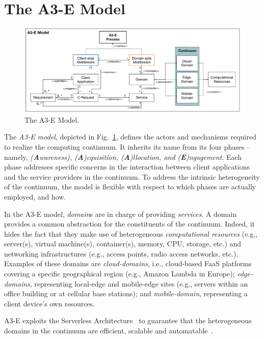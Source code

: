 \section{The A3-E Model}\label{sec:proposal}

\begin{figure}[tbp]
	\includegraphics[width=1\textwidth]{figs/A3-E-model.pdf}
	\caption{The A3-E Model.}
	\label{fig:A3-E-model}
\end{figure}

The \textit{A3-E model}, depicted in Fig.~\ref{fig:A3-E-model}, defines the actors and mechanisms required to realize the computing continuum. It inherits its name from its four phases -- namely, \textit{(\textbf{A}wareness), (\textbf{A})cquisition, (\textbf{A})llocation, and (\textbf{E})ngagement}. Each phase addresses specific concerns in the interaction between client applications and the service providers in the continuum. To address the intrinsic heterogeneity of the continuum, the model is flexible with respect to which phases are actually employed, and how.

In the A3-E model, \textit{domain}s are in charge of providing \textit{services}. A domain provides a common abstraction for the constituents of the continuum. Indeed, it hides the fact that they make use of heterogeneous \textit{computational resources} (e.g., server(s), virtual machine(s), container(s), memory, CPU, storage, etc.) and networking infrastructures (e.g., access points, radio access networks, etc.). Examples of these domains are \textit{cloud-domains}, i.e., cloud-based FaaS platforms covering a specific geographical region (e.g., Amazon Lambda in Europe); \textit{edge-domains}, representing local-edge and mobile-edge sites (e.g., servers within an office building or at cellular base stations); and \textit{mobile-domain}, representing a client device's own resources.

A3-E exploits the Serverless Architecture~\cite{baldini2017serverless} to guarantee that the heterogeneous domains in the continuum are efficient, scalable and automatable~\cite{GarrigaMendonca2017,Hendrickson:2016}.

